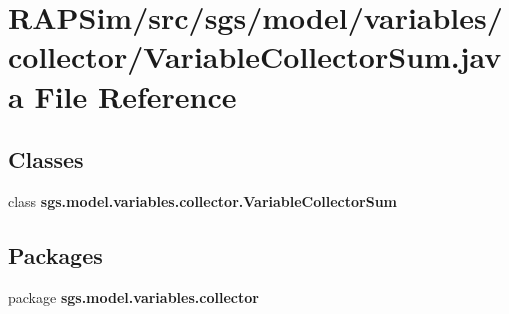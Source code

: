 \section{R\-A\-P\-Sim/src/sgs/model/variables/collector/\-Variable\-Collector\-Sum.java File Reference}
\label{_variable_collector_sum_8java}
\subsection*{Classes}
\begin{DoxyCompactItemize}
\item 
class {\bf sgs.\-model.\-variables.\-collector.\-Variable\-Collector\-Sum}
\end{DoxyCompactItemize}
\subsection*{Packages}
\begin{DoxyCompactItemize}
\item 
package {\bf sgs.\-model.\-variables.\-collector}
\end{DoxyCompactItemize}
